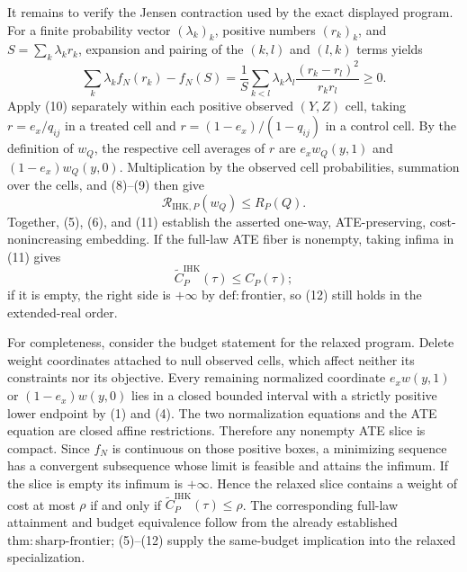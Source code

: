 It remains to verify the Jensen contraction used by the exact displayed program.  For a finite probability vector \((\lambda_k)_k\), positive numbers \((r_k)_k\), and \(S=\sum_k\lambda_kr_k\), expansion and pairing of the \((k,l)\) and \((l,k)\) terms yields
\[
\sum_k\lambda_k f_N(r_k)-f_N(S)
=\frac{1}{S}\sum_{k<l}\lambda_k\lambda_l
\frac{(r_k-r_l)^2}{r_kr_l}\geq0.
\tag{10}
\]
Apply (10) separately within each positive observed \((Y,Z)\) cell, taking \(r=e_x/q_{ij}\) in a treated cell and \(r=(1-e_x)/(1-q_{ij})\) in a control cell.  By the definition of \(w_Q\), the respective cell averages of \(r\) are \(e_xw_Q(y,1)\) and \((1-e_x)w_Q(y,0)\).  Multiplication by the observed cell probabilities, summation over the cells, and (8)--(9) then give
\[
\mathscr R_{\mathrm{IHK},P}(w_Q)\leq R_P(Q).
\tag{11}
\]
Together, (5), (6), and (11) establish the asserted one-way, ATE-preserving, cost-nonincreasing embedding.  If the full-law ATE fiber is nonempty, taking infima in (11) gives
\[
\widetilde C^{\mathrm{IHK}}_P(\tau)\leq C_P(\tau);
\tag{12}
\]
if it is empty, the right side is \(+\infty\) by \(\mathrm{def{:}frontier}\), so (12) still holds in the extended-real order.

For completeness, consider the budget statement for the relaxed program.  Delete weight coordinates attached to null observed cells, which affect neither its constraints nor its objective.  Every remaining normalized coordinate \(e_xw(y,1)\) or \((1-e_x)w(y,0)\) lies in a closed bounded interval with a strictly positive lower endpoint by (1) and (4).  The two normalization equations and the ATE equation are closed affine restrictions.  Therefore any nonempty ATE slice is compact.  Since \(f_N\) is continuous on those positive boxes, a minimizing sequence has a convergent subsequence whose limit is feasible and attains the infimum.  If the slice is empty its infimum is \(+\infty\).  Hence the relaxed slice contains a weight of cost at most \(\rho\) if and only if \(\widetilde C^{\mathrm{IHK}}_P(\tau)\leq\rho\).  The corresponding full-law attainment and budget equivalence follow from the already established \(\mathrm{thm{:}sharp\mbox{-}frontier}\); (5)--(12) supply the same-budget implication into the relaxed specialization.

